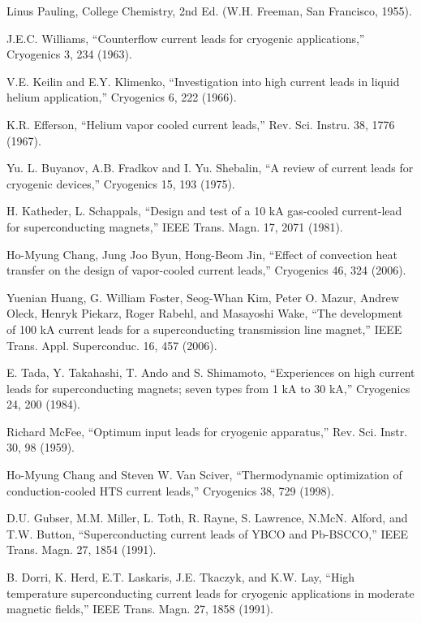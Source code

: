 \noindent [4.46] Linus Pauling, College Chemistry, 2nd Ed. (W.H. Freeman, San Francisco, 1955).

\noindent [4.47] J.E.C. Williams, ``Counterflow current leads for cryogenic applications,” Cryogenics 3, 234 (1963).

\noindent [4.48] V.E. Keilin and E.Y. Klimenko, ``Investigation into high current leads in liquid
helium application,” Cryogenics 6, 222 (1966).

\noindent [4.49] K.R. Efferson, ``Helium vapor cooled current leads,” Rev. Sci. Instru. 38, 1776
(1967).

\noindent [4.50] Yu. L. Buyanov, A.B. Fradkov and I. Yu. Shebalin, ``A review of current leads for cryogenic devices,” Cryogenics 15, 193 (1975).

\noindent [4.51] H. Katheder, L. Schappals, ``Design and test of a 10 kA gas-cooled current-lead
for superconducting magnets,” IEEE Trans. Magn. 17, 2071 (1981).

\noindent [4.52] Ho-Myung Chang, Jung Joo Byun, Hong-Beom Jin, ``Effect of convection heat
transfer on the design of vapor-cooled current leads,” Cryogenics 46, 324 (2006).

\noindent [4.53] Yuenian Huang, G. William Foster, Seog-Whan Kim, Peter O. Mazur, Andrew
Oleck, Henryk Piekarz, Roger Rabehl, and Masayoshi Wake, ``The development
of 100 kA current leads for a superconducting transmission line magnet,” IEEE
Trans. Appl. Superconduc. 16, 457 (2006).

\noindent [4.54] E. Tada, Y. Takahashi, T. Ando and S. Shimamoto, ``Experiences on high current
leads for superconducting magnets; seven types from 1 kA to 30 kA,” Cryogenics 24, 200 (1984).

\noindent [4.55] Richard McFee, ``Optimum input leads for cryogenic apparatus,” Rev. Sci. Instr.
30, 98 (1959).

\noindent [4.56] Ho-Myung Chang and Steven W. Van Sciver, ``Thermodynamic optimization of
conduction-cooled HTS current leads,” Cryogenics 38, 729 (1998).

\noindent [4.57] D.U. Gubser, M.M. Miller, L. Toth, R. Rayne, S. Lawrence, N.McN. Alford, and
T.W. Button, ``Superconducting current leads of YBCO and Pb-BSCCO,” IEEE
Trans. Magn. 27, 1854 (1991).

\noindent [4.58] B. Dorri, K. Herd, E.T. Laskaris, J.E. Tkaczyk, and K.W. Lay, ``High temperature
superconducting current leads for cryogenic applications in moderate magnetic
fields,” IEEE Trans. Magn. 27, 1858 (1991).

